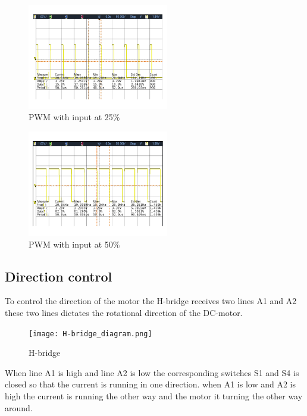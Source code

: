   \begin{figure}[!h]
	\centering
	\includegraphics[width=0.55\textwidth]{resources/Scop/PWM_motot_right_PWMin25.png}
	\caption{PWM with input at 25$\%$}
	\label{fig:1}
\end{figure}

  \begin{figure}[!h]
	\centering
	\includegraphics[width=0.55\textwidth]{resources/Scop/PWM_motot_right_PWMin50.png}
	\caption{PWM with input at 50$\%$}
	\label{fig:2}
\end{figure}

\newpage
\subsection{Direction control} 
To control the direction of the motor the H-bridge receives two lines A1 and A2 these two lines dictates the rotational direction of the DC-motor.

  \begin{figure}[!h!]
	\centering
	\texttt{[image: H-bridge\_diagram.png]}
	\caption{H-bridge}
	\label{fig:3}
\end{figure}
When line A1 is high and line A2 is low the corresponding switches S1 and S4 is closed so that the current is running in one direction. when A1 is low and A2 is high the current is running the other way and the motor it turning the other way around. \\

